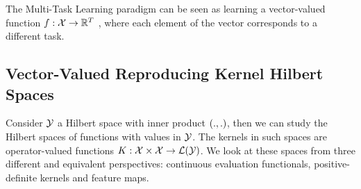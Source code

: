 


The Multi-Task Learning paradigm can be seen as learning a vector-valued function
$f: \mathcal{X} \to \mathbb{R}^T$
, where each element of the vector corresponds to a different task. 


\subsection{Vector-Valued Reproducing Kernel Hilbert Spaces}%
Consider $\mathcal{Y}$ a Hilbert space with inner product $\left( ., . \right)$, then we can study the Hilbert spaces of functions with values in $\mathcal{Y}$. The kernels in such spaces are operator-valued functions $K: \mathcal{X} \times \mathcal{X} \to \mathcal{L}(\mathcal{Y})$.
We look at these spaces from three different and equivalent perspectives: continuous evaluation functionals, positive-definite kernels and feature maps.

